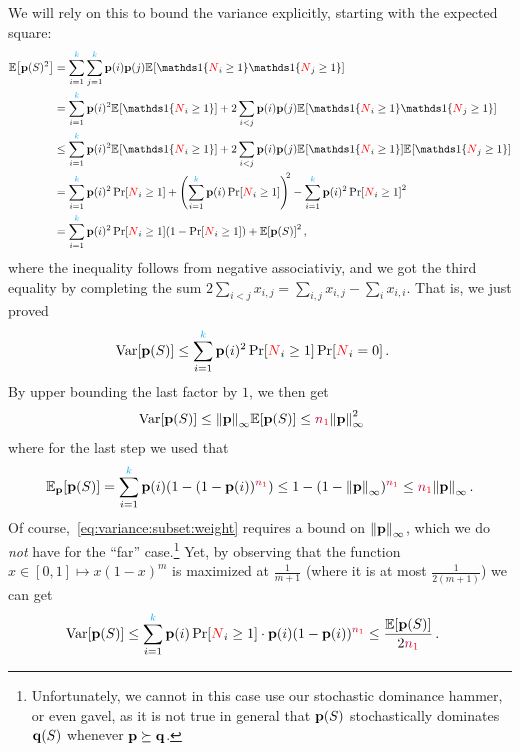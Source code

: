 We will rely on this to bound the variance explicitly, starting with the expected square:
\begin{align*}
  \expect{\p(S)^2} 
  &= \sum_{i=1}^\ab\sum_{j=1}^\ab \p(i)\p(j) \bEE{\indic{\occur_i \geq 1}\indic{\occur_j \geq 1}} \\
  &= \sum_{i=1}^\ab\p(i)^2 \bEE{\indic{\occur_i \geq 1}} + 2\sum_{i< j} \p(i)\p(j) \bEE{\indic{\occur_i \geq 1}\indic{\occur_j \geq 1}} \\
  &\leq \sum_{i=1}^\ab\p(i)^2 \bEE{\indic{\occur_i \geq 1}} + 2\sum_{i< j} \p(i)\p(j) \bEE{\indic{\occur_i \geq 1}}\bEE{\indic{\occur_j \geq 1}} \\
  &= \sum_{i=1}^\ab\p(i)^2 \bPr{\occur_i \geq 1} + \Paren{\sum_{i=1}^\ab \p(i)\bPr{\occur_i \geq 1} }^{\!\!2} - \sum_{i=1}^\ab\p(i)^2 \bPr{\occur_i \geq 1}^2 \\
  &= \sum_{i=1}^\ab\p(i)^2 \bPr{\occur_i \geq 1}(1-\bPr{\occur_i \geq 1}) + \expect{\p(S)}^2\,,
\end{align*}
where the inequality follows from negative associativiy, and we got the third equality by completing the sum $2\sum_{i<j} x_{i,j} = \sum_{i,j} x_{i,j} - \sum_{i} x_{i,i}$. That is, we just proved
\begin{align}
  \Var[\p(S)]
  &\leq \sum_{i=1}^\ab\p(i)^2 \bPr{\occur_i \geq 1}\bPr{\occur_i = 0}\,.
\end{align}
By upper bounding the last factor by $1$, we then get
\begin{align}
  \Var[\p(S)]
  &\leq \norminf{\p}\expect{\p(S)} \leq \nss\norminf{\p}^2\, \label{eq:variance:subset:weight}
\end{align}
where for the last step we used that
\[
\bE{\p}{\p(S)} = \sum_{i=1}^\ab \p(i) (1-(1-\p(i))^{\nss}) %
\leq 1-(1-\norminf{\p})^{\nss}
\leq \nss\norminf{\p}\,.
\]
Of course,~\cref{eq:variance:subset:weight} requires a bound on $\norminf{\p}$, which we do \emph{not} have for the ``far'' case.\footnote{Unfortunately, we cannot in this case use our stochastic dominance hammer, or even gavel, as it is not true in general that $\mathbf{p}(S)$ stochastically dominates $\mathbf{q}(S)$ whenever $\mathbf{p}\succeq\mathbf{q}$.} Yet, by observing that the function $x\in[0,1]\mapsto x(1-x)^m$ is maximized at $\frac{1}{m+1}$ (where it is at most $\frac{1}{2(m+1)}$) we can get
\begin{align}
  \Var[\p(S)]
  &\leq \sum_{i=1}^\ab\p(i) \bPr{\occur_i \geq 1} \cdot \p(i) (1-\p(i))^{\nss}
  \leq \frac{\expect{\p(S)}}{2\nss}\,.
\end{align}

